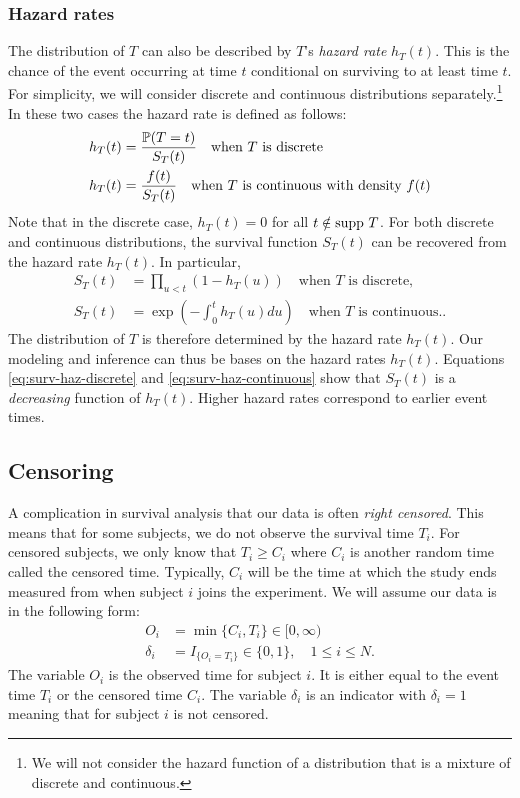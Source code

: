 \subsubsection*{Hazard rates}
The distribution of $T$ can also be described by $T$'s \emph{hazard rate} $h_T(t)$. This is the chance of the event occurring at time $t$ conditional on surviving to at least time $t$. For simplicity, we will consider discrete and continuous distributions separately.\footnote{We will not consider the hazard function of a distribution that is a mixture of discrete and continuous.}  In these two cases the hazard rate is defined as follows:
\begin{align}
    h_T(t)&=\frac{{\mathbb P}(T = t)}{S_T(t)} \quad \text{when $T$ is discrete}\label{eq:hazard-discrete}\\
    h_T(t)&= \frac{f(t)}{S_T(t)} \quad \text{when $T$ is continuous with density $f(t)$}\label{eq:hazard-continuous}
\end{align}
Note that in the discrete case, $h_T(t)=0$ for all $t \notin {\text{supp} \ } T$. For both discrete and continuous distributions, the survival function $S_T(t)$ can be recovered from the hazard rate $h_T(t)$. In particular,
\begin{align}
    S_T(t)&=\prod_{u < t}(1-h_T(u)) \quad \text{when $T$ is discrete},\label{eq:surv-haz-discrete}\\
    S_T(t)&=\exp\left(-\int_0^t h_T(u)du\right) \quad \text{when $T$ is continuous}.\label{eq:surv-haz-continuous}.
\end{align}
The distribution of $T$ is therefore determined by the hazard rate $h_T(t)$. Our modeling and inference can thus be bases on the hazard rates $h_T(t)$. Equations \eqref{eq:surv-haz-discrete} and \eqref{eq:surv-haz-continuous} show that $S_T(t)$ is a \emph{decreasing} function of $h_T(t)$. Higher hazard rates correspond to earlier event times.

\subsection{Censoring}

A complication in survival analysis that our data is often \emph{right censored}. This means that for some subjects, we do not observe the survival time $T_i$. For censored subjects, we only know that $T_i \ge C_i$ where $C_i$ is another random time called the censored time. Typically, $C_i$ will be the time at which the study ends measured from when subject $i$ joins the experiment. We will assume our data is in the following form:
\begin{align}
    O_i &= \min\{C_i,T_i\} \in [0,\infty) \nonumber \\
    \delta_i &=I_{\{O_i = T_i\}} \in\{0,1\}, \quad 1 \le i \le N.\label{eq:surv-model1}
\end{align}
The variable $O_i$ is the observed time for subject $i$. It is either equal to the event time $T_i$ or the censored time $C_i$. The variable $\delta_i$ is an indicator with $\delta_i=1$ meaning that for subject $i$ is not censored.

